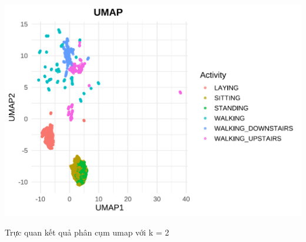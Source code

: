 \documentclass[
]{article}
\begin{document}
\includegraphics{report_files/figure-latex/unnamed-chunk-28-1.pdf}

Trực quan kết quả phân cụm umap với k = 2
\end{document}
